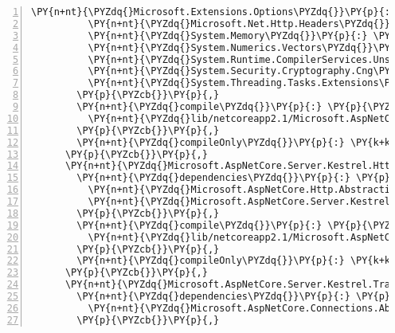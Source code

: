 \begin{Verbatim}[commandchars=\\\{\},numbers=left,firstnumber=1,stepnumber=1,numberblanklines=0]
          \PY{n+nt}{\PYZdq{}Microsoft.Extensions.Options\PYZdq{}}\PY{p}{:} \PY{l+s+s2}{\PYZdq{}2.1.0\PYZhy{}rc1\PYZhy{}final\PYZdq{}}\PY{p}{,}
          \PY{n+nt}{\PYZdq{}Microsoft.Net.Http.Headers\PYZdq{}}\PY{p}{:} \PY{l+s+s2}{\PYZdq{}2.1.0\PYZhy{}rc1\PYZhy{}final\PYZdq{}}\PY{p}{,}
          \PY{n+nt}{\PYZdq{}System.Memory\PYZdq{}}\PY{p}{:} \PY{l+s+s2}{\PYZdq{}4.5.0\PYZhy{}rc1\PYZdq{}}\PY{p}{,}
          \PY{n+nt}{\PYZdq{}System.Numerics.Vectors\PYZdq{}}\PY{p}{:} \PY{l+s+s2}{\PYZdq{}4.5.0\PYZhy{}rc1\PYZdq{}}\PY{p}{,}
          \PY{n+nt}{\PYZdq{}System.Runtime.CompilerServices.Unsafe\PYZdq{}}\PY{p}{:} \PY{l+s+s2}{\PYZdq{}4.5.0\PYZhy{}rc1\PYZdq{}}\PY{p}{,}
          \PY{n+nt}{\PYZdq{}System.Security.Cryptography.Cng\PYZdq{}}\PY{p}{:} \PY{l+s+s2}{\PYZdq{}4.5.0\PYZhy{}rc1\PYZdq{}}\PY{p}{,}
          \PY{n+nt}{\PYZdq{}System.Threading.Tasks.Extensions\PYZdq{}}\PY{p}{:} \PY{l+s+s2}{\PYZdq{}4.5.0\PYZhy{}rc1\PYZdq{}}
        \PY{p}{\PYZcb{}}\PY{p}{,}
        \PY{n+nt}{\PYZdq{}compile\PYZdq{}}\PY{p}{:} \PY{p}{\PYZob{}}
          \PY{n+nt}{\PYZdq{}lib/netcoreapp2.1/Microsoft.AspNetCore.Server.Kestrel.Core.dll\PYZdq{}}\PY{p}{:} \PY{p}{\PYZob{}}\PY{p}{\PYZcb{}}
        \PY{p}{\PYZcb{}}\PY{p}{,}
        \PY{n+nt}{\PYZdq{}compileOnly\PYZdq{}}\PY{p}{:} \PY{k+kc}{true}
      \PY{p}{\PYZcb{}}\PY{p}{,}
      \PY{n+nt}{\PYZdq{}Microsoft.AspNetCore.Server.Kestrel.Https/2.1.0\PYZhy{}rc1\PYZhy{}final\PYZdq{}}\PY{p}{:} \PY{p}{\PYZob{}}
        \PY{n+nt}{\PYZdq{}dependencies\PYZdq{}}\PY{p}{:} \PY{p}{\PYZob{}}
          \PY{n+nt}{\PYZdq{}Microsoft.AspNetCore.Http.Abstractions\PYZdq{}}\PY{p}{:} \PY{l+s+s2}{\PYZdq{}2.1.0\PYZhy{}rc1\PYZhy{}final\PYZdq{}}\PY{p}{,}
          \PY{n+nt}{\PYZdq{}Microsoft.AspNetCore.Server.Kestrel.Core\PYZdq{}}\PY{p}{:} \PY{l+s+s2}{\PYZdq{}2.1.0\PYZhy{}rc1\PYZhy{}final\PYZdq{}}
        \PY{p}{\PYZcb{}}\PY{p}{,}
        \PY{n+nt}{\PYZdq{}compile\PYZdq{}}\PY{p}{:} \PY{p}{\PYZob{}}
          \PY{n+nt}{\PYZdq{}lib/netcoreapp2.1/Microsoft.AspNetCore.Server.Kestrel.Https.dll\PYZdq{}}\PY{p}{:} \PY{p}{\PYZob{}}\PY{p}{\PYZcb{}}
        \PY{p}{\PYZcb{}}\PY{p}{,}
        \PY{n+nt}{\PYZdq{}compileOnly\PYZdq{}}\PY{p}{:} \PY{k+kc}{true}
      \PY{p}{\PYZcb{}}\PY{p}{,}
      \PY{n+nt}{\PYZdq{}Microsoft.AspNetCore.Server.Kestrel.Transport.Abstractions/2.1.0\PYZhy{}rc1\PYZhy{}final\PYZdq{}}\PY{p}{:} \PY{p}{\PYZob{}}
        \PY{n+nt}{\PYZdq{}dependencies\PYZdq{}}\PY{p}{:} \PY{p}{\PYZob{}}
          \PY{n+nt}{\PYZdq{}Microsoft.AspNetCore.Connections.Abstractions\PYZdq{}}\PY{p}{:} \PY{l+s+s2}{\PYZdq{}2.1.0\PYZhy{}rc1\PYZhy{}final\PYZdq{}}
        \PY{p}{\PYZcb{}}\PY{p}{,}

\end{Verbatim}
